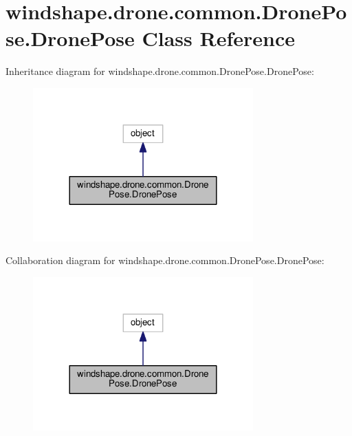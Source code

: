 \hypertarget{classwindshape_1_1drone_1_1common_1_1_drone_pose_1_1_drone_pose}{}\section{windshape.\+drone.\+common.\+Drone\+Pose.\+Drone\+Pose Class Reference}
\label{classwindshape_1_1drone_1_1common_1_1_drone_pose_1_1_drone_pose}


Inheritance diagram for windshape.\+drone.\+common.\+Drone\+Pose.\+Drone\+Pose\+:\nopagebreak
\begin{figure}[H]
\begin{center}
\leavevmode
\includegraphics[width=240pt]{classwindshape_1_1drone_1_1common_1_1_drone_pose_1_1_drone_pose__inherit__graph}
\end{center}
\end{figure}


Collaboration diagram for windshape.\+drone.\+common.\+Drone\+Pose.\+Drone\+Pose\+:\nopagebreak
\begin{figure}[H]
\begin{center}
\leavevmode
\includegraphics[width=240pt]{classwindshape_1_1drone_1_1common_1_1_drone_pose_1_1_drone_pose__coll__graph}
\end{center}
\end{figure}
